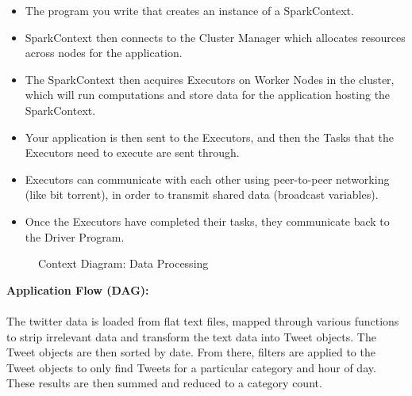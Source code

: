 \documentclass[12pt]{article} %
\begin{document}
	\begin{itemize}
		\item The program you write that creates an instance of a SparkContext.
		\item  SparkContext then connects to the Cluster Manager which allocates resources across nodes for the application.
		\item The SparkContext then acquires Executors on Worker Nodes in the cluster, which will run computations and store data for the application hosting the SparkContext.
		\item Your application is then sent to the Executors, and then the Tasks that the Executors need to execute are sent through.
		\item 	Executors can communicate with each other using peer-to-peer networking (like bit torrent), in order to transmit shared data (broadcast variables).
		\item Once the Executors have completed their tasks, they communicate back to the Driver Program.
		
	\end{itemize}	
	
	\begin{figure}[H] %
		\caption{Context Diagram: Data Processing}
		\label{fig:speciation}
	\end{figure}
	

	\textbf{Application Flow (DAG):}
	\\
	\
	\\
	The twitter data is loaded from flat text files, mapped through various functions to strip irrelevant data and transform the text data into Tweet objects. The Tweet objects are then sorted by date. From there, filters are applied to the Tweet objects to only find Tweets for a particular category and hour of day. These results are then summed and reduced to a category count.
	
\end{document}

